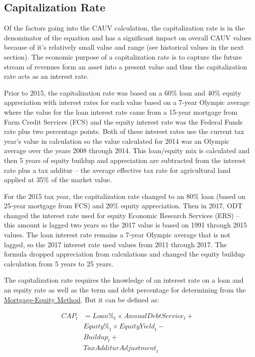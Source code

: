 \documentclass[]{article}
\begin{document}
\hypertarget{capitalization-rate}{%
\subsection{Capitalization Rate}\label{capitalization-rate}}

Of the factors going into the CAUV calculation, the capitalization rate
is in the denominator of the equation and has a significant impact on
overall CAUV values because of it's relatively small value and range
(see historical values in the next section). The economic purpose of a
capitalization rate is to capture the future stream of revenues form an
asset into a present value and thus the capitalization rate acts as an
interest rate.

Prior to 2015, the capitalization rate was based on a 60\% loan and 40\%
equity appreciation with interest rates for each value based on a 7-year
Olympic average where the value for the loan interest rate came from a
15-year mortgage from Farm Credit Services (FCS) and the equity interest
rate was the Federal Funds rate plus two percentage points. Both of
these interest rates use the current tax year's value in calculation so
the value calculated for 2014 was an Olympic average over the years 2008
through 2014. This loan/equity mix is calculated and then 5 years of
equity buildup and appreciation are subtracted from the interest rate
plus a tax additur -- the average effective tax rate for agricultural
land applied at 35\% of the market value.

For the 2015 tax year, the capitalization rate changed to an 80\% loan
(based on 25-year mortgage from FCS) and 20\% equity appreciation. Then
in 2017, ODT changed the interest rate used for equity Economic Research
Services (ERS) -- this amount is lagged two years so the 2017 value is
based on 1991 through 2015 values. The loan interest rate remains a
7-year Olympic average that is not lagged, so the 2017 interest rate
used values from 2011 through 2017. The formula dropped appreciation
from calculations and changed the equity buildup calculation from 5
years to 25 years.

The capitalization rate requires the knowledge of an interest rate on a
loan and an equity rate as well as the term and debt percentage for
determining from the
\href{http://www.commercialappraisalsoftware.dcfsoftware.com/mtgequity.htm}{Mortgage-Equity
Method}. But it can be defined as:

\[ \begin{aligned}
{CAP_t} &= {Loan \%}_t \times {Annual Debt Service}_t + \\
& {Equity \%}_t \times {Equity Yield}_t - \nonumber \\
& {Buildup}_t + \nonumber \\
& {Tax Additur Adjustment}_t
\end{aligned} \]
\end{document}
